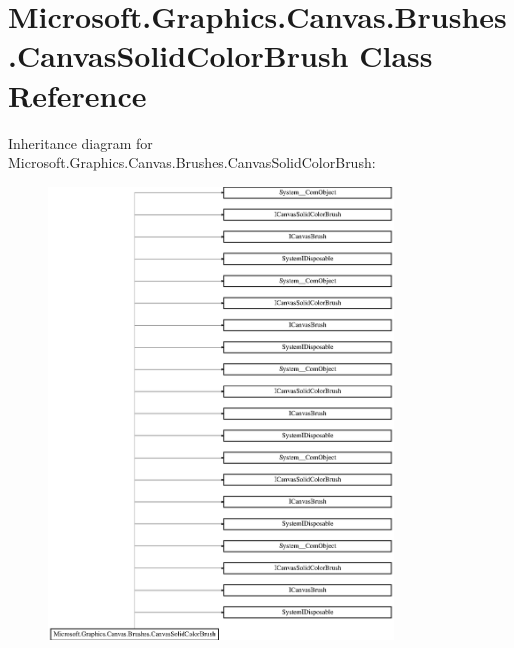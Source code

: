 \hypertarget{class_microsoft_1_1_graphics_1_1_canvas_1_1_brushes_1_1_canvas_solid_color_brush}{}\section{Microsoft.\+Graphics.\+Canvas.\+Brushes.\+Canvas\+Solid\+Color\+Brush Class Reference}
\label{class_microsoft_1_1_graphics_1_1_canvas_1_1_brushes_1_1_canvas_solid_color_brush}
Inheritance diagram for Microsoft.\+Graphics.\+Canvas.\+Brushes.\+Canvas\+Solid\+Color\+Brush\+:\begin{figure}[H]
\begin{center}
\leavevmode
\includegraphics[height=12.000000cm]{class_microsoft_1_1_graphics_1_1_canvas_1_1_brushes_1_1_canvas_solid_color_brush}
\end{center}
\end{figure}

